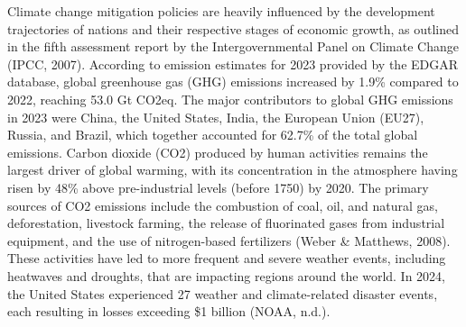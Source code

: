 \documentclass[12pt,a4paper]{article}
\begin{document}
Climate change mitigation policies are heavily influenced by the development trajectories of nations and their respective stages of economic growth, as outlined in the fifth assessment report by the Intergovernmental Panel on Climate Change (IPCC, 2007). According to emission estimates for 2023 provided by the EDGAR database, global greenhouse gas (GHG) emissions increased by 1.9\% compared to 2022, reaching 53.0 Gt CO2eq. The major contributors to global GHG emissions in 2023 were China, the United States, India, the European Union (EU27), Russia, and Brazil, which together accounted for 62.7\% of the total global emissions. Carbon dioxide (CO2) produced by human activities remains the largest driver of global warming, with its concentration in the atmosphere having risen by 48\% above pre-industrial levels (before 1750) by 2020. The primary sources of CO2 emissions include the combustion of coal, oil, and natural gas, deforestation, livestock farming, the release of fluorinated gases from industrial equipment, and the use of nitrogen-based fertilizers (Weber \& Matthews, 2008). These activities have led to more frequent and severe weather events, including heatwaves and droughts, that are impacting regions around the world. In 2024, the United States experienced 27 weather and climate-related disaster events, each resulting in losses exceeding \$1 billion (NOAA, n.d.).
\vspace{5 pt}
\end{document}
